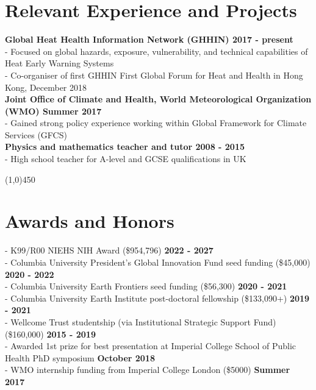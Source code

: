 \section*{Relevant Experience and Projects}

\noindent \textbf{Global Heat Health Information Network (GHHIN) \hfill 2017 - present}								\\
- Focused on global hazards, exposure, vulnerability, and technical capabilities of Heat Early Warning Systems		\\
- Co-organiser of first GHHIN First Global Forum for Heat and Health in Hong Kong, December 2018\\

\noindent \textbf{Joint Office of Climate and Health, World Meteorological Organization (WMO) \hfill Summer 2017}	\\
\noindent - Gained strong policy experience working within Global Framework for Climate Services (GFCS)\\

\noindent \textbf{Physics and mathematics teacher and tutor \hfill 2008 - 2015}\\
- High school teacher for A-level and GCSE qualifications in UK

\begin{center} \line(1,0){450} \end{center}

\section*{Awards and Honors}
- K99/R00 NIEHS NIH Award (\$954,796) \hfill \textbf{2022 - 2027}\\
- Columbia University President’s Global Innovation Fund seed funding (\$45,000) \hfill \textbf{2020 - 2022}\\
- Columbia University Earth Frontiers seed funding (\$56,300) \hfill \textbf{2020 - 2021}\\
- Columbia University Earth Institute post-doctoral fellowship (\$133,090+) \textbf {\hfill 2019 - 2021}\\
-  Wellcome Trust studentship (via Institutional Strategic Support Fund) (\$160,000) \textbf {\hfill 2015 - 2019}\\	
- Awarded 1st prize for best presentation at Imperial College School of Public Health PhD symposium \textbf {\hfill October 2018}\\
- WMO internship funding from Imperial College London (\$5000) \textbf{ {\hfill  Summer 2017}}\\

